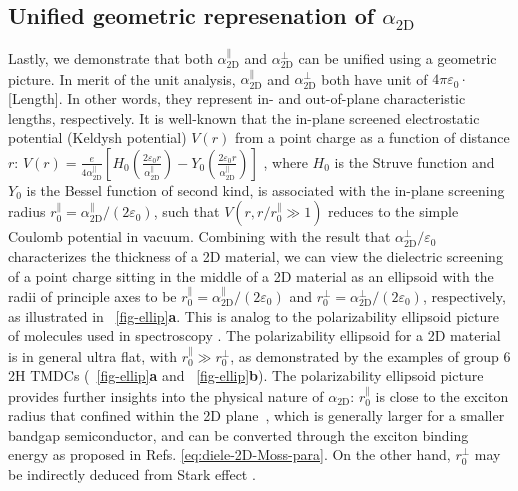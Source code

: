 \subsection{Unified geometric represenation of $\alpha_{\mathrm{2D}}$}
\label{sec:diel-unif-geom-repr}

%
Lastly, we demonstrate that both $\alpha_{\mathrm{2D}}^{\parallel}$
and $\alpha_{\mathrm{2D}}^{\perp}$ can be unified using a geometric
picture. In merit of the unit analysis,
$\alpha_{\mathrm{2D}}^{\parallel}$ and $\alpha_{\mathrm{2D}}^{\perp}$
both have unit of $4\pi\varepsilon_{0} \cdot$[Length]. In other words,
they represent in- and out-of-plane characteristic lengths,
respectively. It is well-known that the in-plane screened
electrostatic potential (Keldysh potential) $V(r)$ from a point charge
as a function of distance $r$:
$V(r) = {\displaystyle \frac{e}{4 \alpha_{\mathrm{2D}}^{\parallel}}}
\left[H_{0}({\displaystyle \frac{2\varepsilon_{0}
      r}{\alpha_{\mathrm{2D}}^{\parallel}}}) - Y_{0}( {\displaystyle
    \frac{2
      \varepsilon_{0}r}{\alpha_{\mathrm{2D}}^{\parallel}}})\right]$
\cite{Keldysh_1979_eps_multi,Pulci_2014_exciton}, where $H_{0}$ is the Struve
function and $Y_{0}$ is the Bessel function of second kind, is
associated with the in-plane screening radius
$r_{0}^{\parallel}=\alpha_{\mathrm{2D}}^{\parallel}/(2
\varepsilon_{0})$, such that $V(r,r/r^{\parallel}_{0} \gg 1)$ reduces
to the simple Coulomb potential in vacuum. Combining with the result
that $\alpha_{\mathrm{2D}}^{\perp}/\varepsilon_{0}$ characterizes the
thickness of a 2D material, we can view the dielectric screening of a
point charge sitting in the middle of a 2D material as an ellipsoid
with the radii of principle axes to be
$r_{0}^{\parallel} = \alpha_{\mathrm{2D}}^{\parallel}/(2
\varepsilon_{0})$ and
$r_{0}^{\perp} = \alpha^{\perp}_{\mathrm{2D}}/(2 \varepsilon_{0})$,
respectively, as illustrated in ~\autoref{fig-ellip}\textbf{a}.
This is analog to the polarizability ellipsoid picture of molecules
used in spectroscopy \cite{Banwell_1994_spectro_book}. The polarizability ellipsoid
for a 2D material is in general ultra flat, with
$r_{0}^{\parallel} \gg r_{0}^{\perp}$, as demonstrated by the examples
of group 6 2H TMDCs (~\autoref{fig-ellip}\textbf{a} and
~\autoref{fig-ellip}\textbf{b}). The polarizability ellipsoid picture
provides further insights into the physical nature of
$\alpha_{\mathrm{2D}}$: $r_{0}^{\parallel}$ is close to the exciton
radius that confined within the 2D plane~\cite{Pulci_2014_exciton}, which is
generally larger for a smaller bandgap semiconductor, and can be
converted through the exciton binding energy as proposed in
Refs. \cite{Olsen_2016_hydrogen,Jiang_2017_Eg_Eb}
 \autoref{eq:diele-2D-Moss-para}. On the other hand, $r_{0}^{\perp}$ may be
indirectly deduced from Stark effect
\cite{Pedersen_2016_shark_effect_TMDC,Klein_2016_stark_eff,Roch_2018_stark_eff}.

